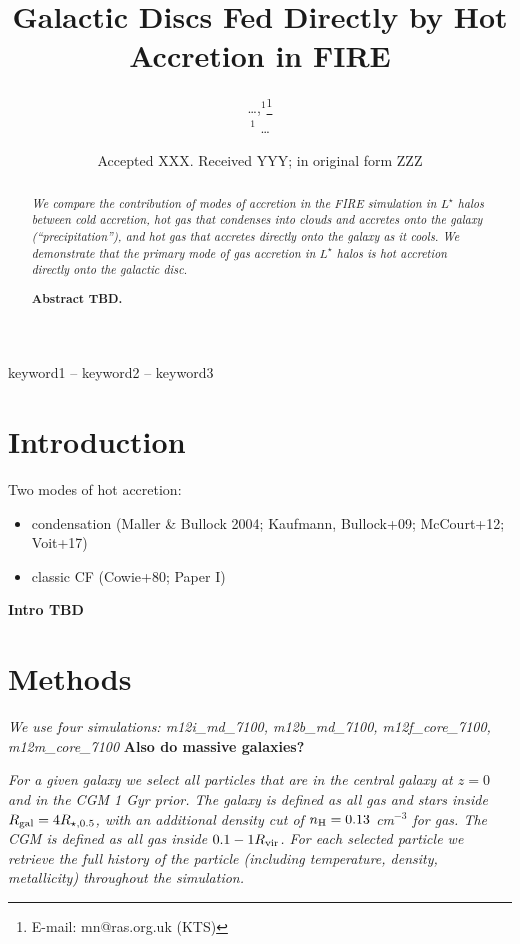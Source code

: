 \documentclass[fleqn,usenatbib]{mnras}
\title[Hot Accretion in FIRE]{Galactic Discs Fed Directly by Hot Accretion in FIRE}
\author[\ldots]{
\ldots,$^{1}$\thanks{E-mail: mn@ras.org.uk (KTS)}
\\
$^1$ \ldots
}
\date{Accepted XXX. Received YYY; in original form ZZZ}
\begin{document}
\label{firstpage}
\pagerange{\pageref{firstpage}--\pageref{lastpage}}
\maketitle

\begin{abstract}
\textit{
We compare the contribution of modes of accretion in the FIRE simulation in $L^\star$ halos between cold accretion, hot gas that condenses into clouds and accretes onto the galaxy (``precipitation''), and hot gas that accretes directly onto the galaxy as it cools.
We demonstrate that the primary mode of gas accretion in $L^\star$ halos is hot accretion directly onto the galactic disc.
}

\textbf{Abstract TBD.}
\end{abstract}

\begin{keywords}
keyword1 -- keyword2 -- keyword3
\end{keywords}



\section{Introduction}
Two modes of hot accretion:
\begin{itemize}
    \item condensation (Maller \& Bullock 2004; Kaufmann, Bullock+09; McCourt+12; Voit+17)
    \item classic CF (Cowie+80; Paper I)
\end{itemize}
\textbf{Intro TBD}

\section{Methods}

\textit{
We use four simulations:
m12i\_md\_7100, m12b\_md\_7100, m12f\_core\_7100, m12m\_core\_7100
}
\textbf{Also do massive galaxies?}

\textit{
For a given galaxy we select all particles that are in the central galaxy at $z=0$ and in the CGM 1 Gyr prior.
The galaxy is defined as all gas and stars inside $R_{\rm gal} = 4 R_{\star,0.5}$, with an additional density cut of $n_{\rm H} = 0.13$ cm$^{-3}$ for gas.
The CGM is defined as all gas inside $0.1 -1 R_{\rm vir}$.
For each selected particle we retrieve the full history of the particle (including temperature, density, metallicity) throughout the simulation.
}
\end{document}
